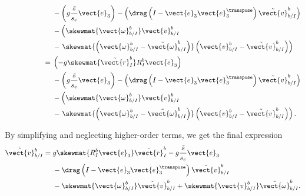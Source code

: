 \begin{align}
\begin{split}
    &-\left(g\frac{\tilde{s}}{s_e}\vect{e}_3\right)
    -\left(\drag \left( I - \vect{e}_3 \vect{e}_3^\transpose \right)
    \tilde{\vect{v}}_{b/I}^b\right) \\
    &- \left(\skewmat{\vect{\omega}_{b/I}^b}\vect{v}_{b/I}^b\right. \\
    &-\left.\skewmat{\left(\vect{\omega}_{b/I}^{b} - \tilde{\vect{\omega}}_{b/I}^{b}\right)} 
  \left(\vect{v}_{b/I}^{b} - \tilde{\vect{v}}_{b/I}^{b}\right)\right) \\
\end{split} \\
\begin{split}
  \phantom{\dot{\tilde{\vect{v}}}_{b/I}^{b}} = {}& \left(-g
  \skewmat{\tilde{\vect{r}}_I^b} R_I^b \vect{e}_3\right) \\
    &-\left(g\frac{\tilde{s}}{s_e}\vect{e}_3\right)
    -\left(\drag \left( I - \vect{e}_3 \vect{e}_3^\transpose \right)
    \tilde{\vect{v}}_{b/I}^b\right) \\
    &- \left(\skewmat{\vect{\omega}_{b/I}^b}\vect{v}_{b/I}^b\right. \\
    &-\left.\skewmat{\left(\vect{\omega}_{b/I}^{b} - \tilde{\vect{\omega}}_{b/I}^{b}\right)} 
  \left(\vect{v}_{b/I}^{b} - \tilde{\vect{v}}_{b/I}^{b}\right)\right). \\
\end{split}
\end{align}

By simplifying and neglecting higher-order terms, we get the final expression
\begin{equation}
  \begin{split}
  \dot{\tilde{\vect{v}}}_{b/I}^{b} = {}& g
  \skewmat{R_I^b \vect{e}_3} \tilde{\vect{r}}_I^b
    -g\frac{\tilde{s}}{s_e}\vect{e}_3 \\
    &-\drag \left( I - \vect{e}_3 \vect{e}_3^\transpose \right)
    \tilde{\vect{v}}_{b/I}^b \\
    &- \skewmat{\vect{\omega}_{b/I}^b} \tilde{\vect{v}}_{b/I}^b +
    \skewmat{\vect{v}_{b/I}^b} \tilde{\vect{\omega}}_{b/I}^b.
  \end{split}
\end{equation}


